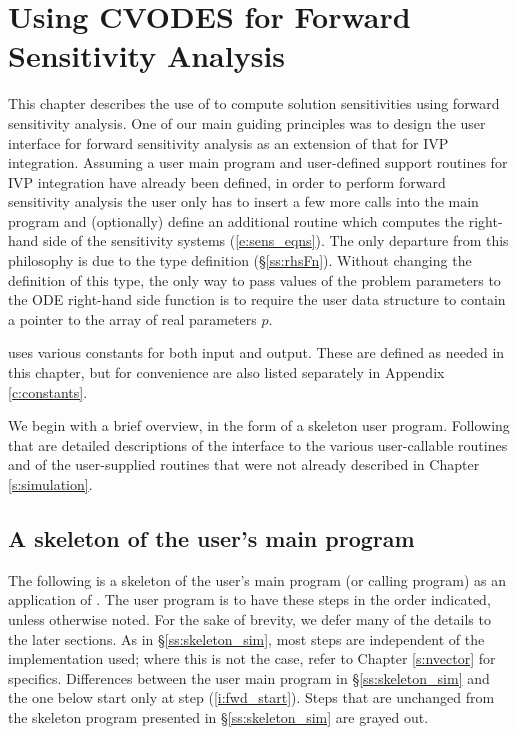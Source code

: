 \chapter{Using CVODES for Forward Sensitivity Analysis}\label{s:forward}

This chapter describes the use of {\cvodes} to compute solution sensitivities using
forward sensitivity analysis. One of our main guiding principles was to design 
the {\cvodes} user interface for forward sensitivity analysis as an extension of
that for IVP integration. Assuming a user main program and user-defined support 
routines for IVP integration have already been defined, in order to perform 
forward sensitivity analysis the user only has to insert a few more calls 
into the main program and (optionally) define an additional routine which
computes the right-hand side of the sensitivity systems (\ref{e:sens_eqns}). 
The only departure from this philosophy is due to the  type definition
(\S\ref{ss:rhsFn}). Without changing the definition of this type, the
only way to pass values of the problem parameters to the ODE right-hand side
function is to require the user data structure  to contain a pointer
to the array of real parameters $p$.

{\cvodes} uses various constants for both input and output.  These are
defined as needed in this chapter, but for convenience are also listed
separately in Appendix \ref{c:constants}.

We begin with a brief overview, in the form of a skeleton user program.
Following that are detailed descriptions of the interface to the
various user-callable routines and of the user-supplied routines that were not
already described in Chapter \ref{s:simulation}.

\section{A skeleton of the user's main program}\label{s:forward_usage}

The following is a skeleton of the user's main program (or calling
program) as an application of {\cvodes}. The user program is to have these 
steps in the order indicated, unless otherwise noted.
For the sake of brevity, we defer many of the details to the later sections.
As in \S\ref{ss:skeleton_sim}, most steps are independent of the {\nvector}
implementation used; where this is not the case, refer to Chapter
\ref{s:nvector} for specifics.
Differences between the user main program in \S\ref{ss:skeleton_sim} and
the one below start only at step (\ref{i:fwd_start}).
Steps that are unchanged from the skeleton program presented in
\S\ref{ss:skeleton_sim} are grayed out.

